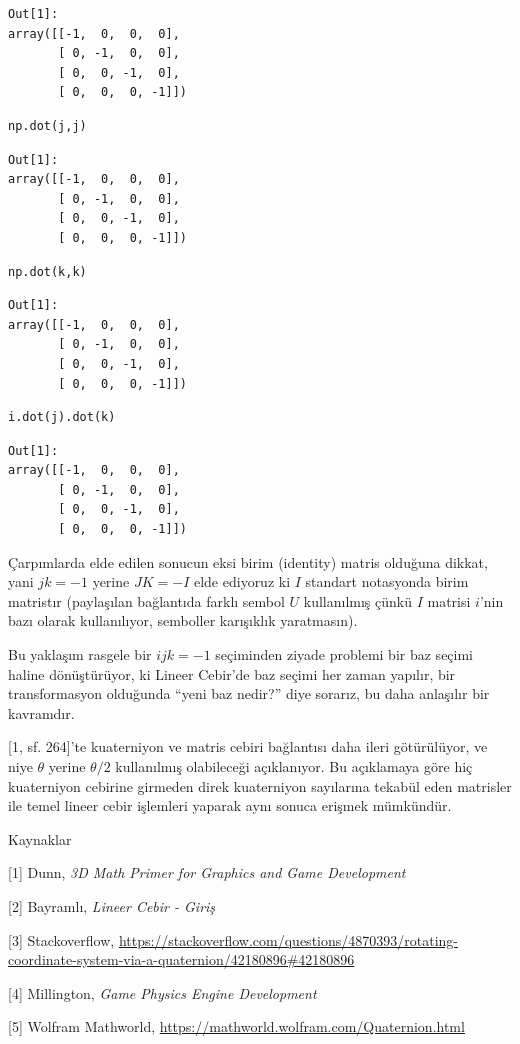 \documentclass[12pt,fleqn]{article}\usepackage{../../common}
\begin{document}
\begin{verbatim}
Out[1]: 
array([[-1,  0,  0,  0],
       [ 0, -1,  0,  0],
       [ 0,  0, -1,  0],
       [ 0,  0,  0, -1]])
\end{verbatim}

\begin{verbatim}
np.dot(j,j)
\end{verbatim}

\begin{verbatim}
Out[1]: 
array([[-1,  0,  0,  0],
       [ 0, -1,  0,  0],
       [ 0,  0, -1,  0],
       [ 0,  0,  0, -1]])
\end{verbatim}

\begin{verbatim}
np.dot(k,k)
\end{verbatim}

\begin{verbatim}
Out[1]: 
array([[-1,  0,  0,  0],
       [ 0, -1,  0,  0],
       [ 0,  0, -1,  0],
       [ 0,  0,  0, -1]])
\end{verbatim}

\begin{verbatim}
i.dot(j).dot(k)
\end{verbatim}

\begin{verbatim}
Out[1]: 
array([[-1,  0,  0,  0],
       [ 0, -1,  0,  0],
       [ 0,  0, -1,  0],
       [ 0,  0,  0, -1]])
\end{verbatim}

Çarpımlarda elde edilen sonucun eksi birim (identity) matris olduğuna dikkat,
yani $jk = -1$ yerine $JK = -I$ elde ediyoruz ki $I$ standart notasyonda birim
matristır (paylaşılan bağlantıda farklı sembol $U$ kullanılmış çünkü $I$ matrisi
$i$'nin bazı olarak kullanılıyor, semboller karışıklık yaratmasın).

Bu yaklaşım rasgele bir $ijk=-1$ seçiminden ziyade problemi bir baz seçimi
haline dönüştürüyor, ki Lineer Cebir'de baz seçimi her zaman yapılır, bir
transformasyon olduğunda ``yeni baz nedir?'' diye sorarız, bu daha anlaşılır
bir kavramdır.

[1, sf. 264]'te kuaterniyon ve matris cebiri bağlantısı daha ileri götürülüyor,
ve niye $\theta$ yerine $\theta / 2$ kullanılmış olabileceği açıklanıyor.  Bu
açıklamaya göre hiç kuaterniyon cebirine girmeden direk kuaterniyon sayılarına
tekabül eden matrisler ile temel lineer cebir işlemleri yaparak aynı sonuca
erişmek mümkündür.

Kaynaklar

[1] Dunn, {\em 3D Math Primer for Graphics and Game Development}

[2] Bayramlı, {\em Lineer Cebir - Giriş}

[3] Stackoverflow,
    \url{https://stackoverflow.com/questions/4870393/rotating-coordinate-system-via-a-quaternion/42180896#42180896}

[4] Millington, {\em Game Physics Engine Development}

[5] Wolfram Mathworld,
    \url{https://mathworld.wolfram.com/Quaternion.html}
\end{document}
